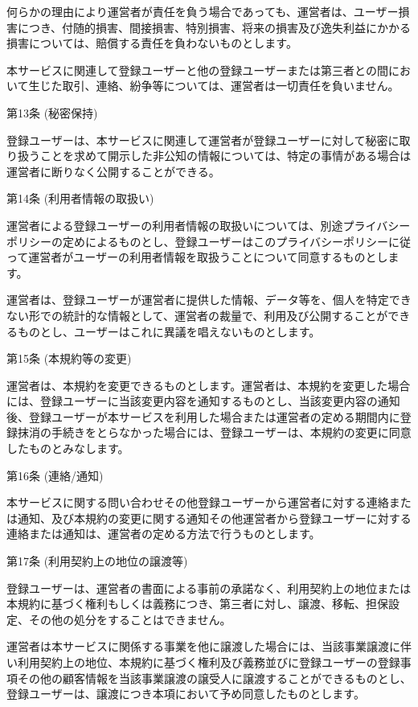     何らかの理由により運営者が責任を負う場合であっても、運営者は、ユーザー損害につき、付随的損害、間接損害、特別損害、将来の損害及び逸失利益にかかる損害については、賠償する責任を負わないものとします。

    本サービスに関連して登録ユーザーと他の登録ユーザーまたは第三者との間において生じた取引、連絡、紛争等については、運営者は一切責任を負いません。

第13条 (秘密保持)

    登録ユーザーは、本サービスに関連して運営者が登録ユーザーに対して秘密に取り扱うことを求めて開示した非公知の情報については、特定の事情がある場合は運営者に断りなく公開することができる。

第14条 (利用者情報の取扱い)

    運営者による登録ユーザーの利用者情報の取扱いについては、別途プライバシーポリシーの定めによるものとし、登録ユーザーはこのプライバシーポリシーに従って運営者がユーザーの利用者情報を取扱うことについて同意するものとします。

    運営者は、登録ユーザーが運営者に提供した情報、データ等を、個人を特定できない形での統計的な情報として、運営者の裁量で、利用及び公開することができるものとし、ユーザーはこれに異議を唱えないものとします。

第15条 (本規約等の変更)

    運営者は、本規約を変更できるものとします。運営者は、本規約を変更した場合には、登録ユーザーに当該変更内容を通知するものとし、当該変更内容の通知後、登録ユーザーが本サービスを利用した場合または運営者の定める期間内に登録抹消の手続きをとらなかった場合には、登録ユーザーは、本規約の変更に同意したものとみなします。

第16条 (連絡/通知)

    本サービスに関する問い合わせその他登録ユーザーから運営者に対する連絡または通知、及び本規約の変更に関する通知その他運営者から登録ユーザーに対する連絡または通知は、運営者の定める方法で行うものとします。

第17条 (利用契約上の地位の譲渡等)

    登録ユーザーは、運営者の書面による事前の承諾なく、利用契約上の地位または本規約に基づく権利もしくは義務につき、第三者に対し、譲渡、移転、担保設定、その他の処分をすることはできません。

    運営者は本サービスに関係する事業を他に譲渡した場合には、当該事業譲渡に伴い利用契約上の地位、本規約に基づく権利及び義務並びに登録ユーザーの登録事項その他の顧客情報を当該事業譲渡の譲受人に譲渡することができるものとし、登録ユーザーは、譲渡につき本項において予め同意したものとします。

